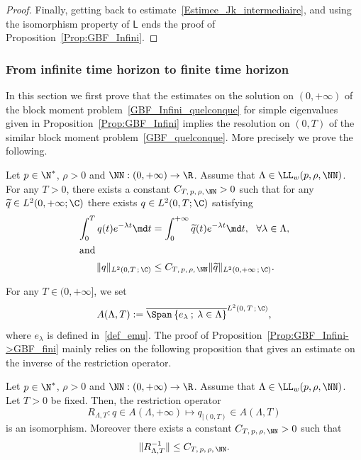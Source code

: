 \begin{proof}
Finally, getting back to estimate~\eqref{Estimee_Jk_intermediaire}, and using the isomorphism property of $\mathsf{L}$ ends the proof of Proposition~\ref{Prop:GBF_Infini}.
\end{proof}



\subsubsection{From infinite time horizon to finite time horizon}\label{Sec:BBM_finite}

In this section we first prove that the estimates on the solution on $(0,+\infty)$ of the block moment problem~\eqref{GBF_Infini_quelconque} for simple eigenvalues given in Proposition~\ref{Prop:GBF_Infini} implies the resolution on $(0,T)$ of the similar block moment problem~\eqref{GBF_quelconque}. More precisely we prove the following.

\begin{prop}\label{Prop:GBF_Infini->GBF_fini}
Let $p \in \N^*$, $ \rho > 0$ and $\NN : (0,+\infty) \to \R$. Assume that $\Lambda \in \LL_w(p,\rho, \NN)$. For any $T>0$, there exists a constant $C_{T,\,p,\,\rho,\,\NN}>0$ such that for any $\widetilde{q} \in L^2(0,+\infty ; \C)$ there exists $q \in L^2(0,T ; \C)$ satisfying
\begin{align*}
\int_0^T q(t) e^{- \lambda t} \md t &= \int_0^{+\infty} \widetilde{q}(t) e^{-\lambda t} \md t, \ \ \forall \lambda\in \Lambda,\label{GBF:Restriction_egalite}\\
\intertext{and}
\| q \|_{L^2(0,T\,;\,\C) } &\leq C_{T,\,p,\,\rho,\, \NN} \| \widetilde{q} \|_{L^2(0,+\infty\,;\, \C)}.
\end{align*}
\end{prop}
For any $T \in (0, +\infty]$, we set
\[
A(\Lambda,T) := \overline{ \Span \left\{ e_\lambda \: ; \: \lambda\in \Lambda\right\}}^{L^2(0,\,T\,;\,\C)},
\]
where $e_\lambda$ is defined in~\eqref{def_emu}. The proof of Proposition~\ref{Prop:GBF_Infini->GBF_fini} mainly relies on the following proposition that gives an estimate on the inverse of the restriction operator.

\begin{prop}\label{Prop:Restriction}
Let $p \in \N^*$, $\rho > 0$ and $\NN : (0,+\infty) \to \R$. Assume that $\Lambda \in \LL_w(p,\rho, \NN)$. Let $T>0$ be fixed. Then, the restriction operator
\begin{equation}\label{OperateurRestriction}
R_{\Lambda,T} : q \in A(\Lambda,+\infty) \mapsto q_{|(0,T)} \in A(\Lambda,T)
\end{equation}
is an isomorphism. Moreover there exists a constant $C_{T,\,p,\,\rho,\,\NN}>0$ such that
\begin{equation}\label{Estimee_Operateur_Restriction}
\| R_{\Lambda,T}^{-1} \| \leq C_{T,\,p,\,\rho,\,\NN}.
\end{equation}
\end{prop}

